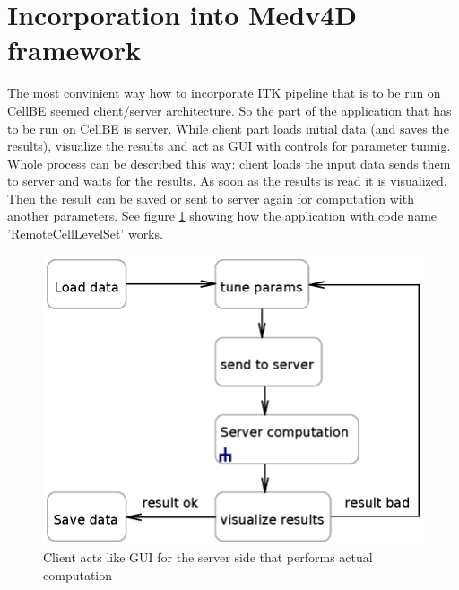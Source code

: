 \section{Incorporation into Medv4D framework}

\par
The most convinient way how to incorporate ITK pipeline that is to be run on CellBE seemed client/server architecture.
So the part of the application that has to be run on CellBE is server.
While client part loads initial data (and saves the results), visualize the results and act as GUI with controls for parameter tunnig.
Whole process can be described this way: client loads the input data sends them to server and waits for the results.
As soon as the results is read it is visualized.
Then the result can be saved or sent to server again for computation with another parameters.
See figure \ref{fg:computationProcess} showing how the application with code name 'RemoteCellLevelSet' works.

\begin{figure}
    \centering
    \includegraphics[width=\textwidth]{data/computationProcess}
    \caption[RemoteCellLevelSet application computation process]{Client acts like GUI for the server side that performs actual computation}
    \label{fg:computationProcess}
\end{figure}

